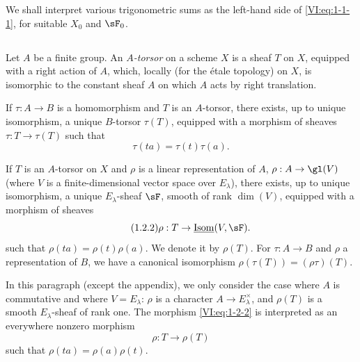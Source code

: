 \documentclass[oneside]{book}
\begin{document}
We shall interpret various trigonometric sums as the left-hand side of 
\eqref{VI:eq:1-1-1}, for suitable $X_0$ and $\sF_0$. 





\subsection{}\label{VI:1-2}

Let $A$ be a finite group. An \emph{$A$-torsor} on a scheme $X$ is a 
sheaf $T$ on $X$, equipped with a right action of $A$, which, locally 
(for the étale topology) on $X$, is isomorphic to the constant sheaf $A$ on 
which $A$ acts by right translation. 

If $\tau:A\to B$ is a homomorphism and $T$ is an $A$-torsor, there exists, 
up to unique isomorphism, a unique $B$-torsor $\tau(T)$, equipped with a 
morphism of sheaves $\tau:T\to \tau(T)$ such that 
\begin{equation*}\tag{1.2.1}\label{VI:eq:1-2-1}
  \tau(t a) = \tau(t) \tau(a)\text{.}
\end{equation*}

If $T$ is an $A$-torsor on $X$ and $\rho$ is a linear representation 
of $A$, $\rho:A\to \gl(V)$ (where $V$ is a finite-dimensional vector space over 
$E_\lambda$), there exists, up to unique isomorphism, a unique 
$E_\lambda$-sheaf $\sF$, smooth of rank $\dim(V)$, equipped with a morphism of 
sheaves 
\begin{equation*}\tag{1.2.2}\label{VI:eq:1-2-2}
  \rho:T\to \underline{\operatorname{Isom}}(V,\sF) \text{.}
\end{equation*}
such that $\rho(t a) = \rho(t) \rho(a)$. We denote it by $\rho(T)$. For 
$\tau:A\to B$ and $\rho$ a representation of $B$, we have a canonical 
isomorphism $\rho(\tau(T)) = (\rho\tau)(T)$. 

In this paragraph (except the appendix), we only consider the case where $A$ 
is commutative and where $V=E_\lambda$: $\rho$ is a character 
$A\to E_\lambda^\times$, and $\rho(T)$ is a smooth $E_\lambda$-sheaf of rank 
one. The morphism \eqref{VI:eq:1-2-2} is interpreted as an everywhere 
nonzero morphism 
\begin{equation*}\tag{1.2.3}\label{VI:eq:1-2-3}
  \rho:T\to \rho(T) 
\end{equation*}
such that $\rho(t a) = \rho(a)\rho(t)$. 
\end{document}
